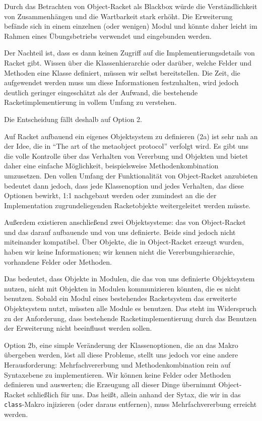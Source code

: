 Durch das Betrachten von Object-Racket als Blackbox würde die Verständlichkeit von Zusammenhängen und die Wartbarkeit stark erhöht. Die Erweiterung befände sich in einem einzelnen (oder wenigen) Modul und könnte daher leicht im Rahmen eines Übungsbetriebs verwendet und eingebunden werden.

Der Nachteil ist, dass es dann keinen Zugriff auf die Implementierungsdetails von Racket gibt. Wissen über die Klassenhierarchie oder darüber, welche Felder und Methoden eine Klasse definiert, müssen wir selbst bereitstellen. Die Zeit, die aufgewendet werden muss um diese Informationen festzuhalten, wird jedoch deutlich geringer eingeschätzt als der Aufwand, die bestehende Racketimplementierung in vollem Umfang zu verstehen. 

Die Entscheidung fällt deshalb auf Option 2.

Auf Racket aufbauend ein eigenes Objektsystem zu definieren (2a) ist sehr nah an der Idee, die in ``The art of the metaobject protocol'' \cite{amop} verfolgt wird. Es gibt uns die volle Kontrolle über das Verhalten von Vererbung und Objekten und bietet daher eine einfache Möglichkeit, beispielsweise Methodenkombination umzusetzen. Den vollen Umfang der Funktionalität von Object-Racket anzubieten bedeutet dann jedoch, dass jede Klassenoption und jedes Verhalten, das diese Optionen bewirkt, 1:1 nachgebaut werden oder zumindest an die der Implementation zugrundeliegenden Racketobjekte weitergeleitet werden müsste.

Außerdem existieren anschließend zwei Objektsysteme: das von Object-Racket und das darauf aufbauende und von uns definierte. Beide sind jedoch nicht miteinander kompatibel. Über Objekte, die in Object-Racket erzeugt wurden, haben wir keine Informationen; wir kennen nicht die Vererbungshierarchie, vorhandene Felder oder Methoden. 

Das bedeutet, dass Objekte in Modulen, die das von uns definierte Objektsystem nutzen, nicht mit Objekten in Modulen kommunizieren könnten, die es nicht benutzen. Sobald ein Modul eines bestehendes Racketsystem das erweiterte Objektsystem nutzt, müssten alle Module es benutzen. Das steht im Widerspruch zu der Anforderung, dass bestehende Racketimplementierung durch das Benutzen der Erweiterung nicht beeinflusst werden sollen.

Option 2b, eine simple Veränderung der Klassenoptionen, die an das Makro übergeben werden, löst all diese Probleme, stellt uns jedoch vor eine andere Herausforderung: Mehrfachvererbung und Methodenkombination rein auf Syntaxebene zu implementieren. Wir können keine Felder oder Methoden definieren und auswerten; die Erzeugung all dieser Dinge übernimmt Object-Racket schließlich für uns. Das heißt, allein anhand der Sytax, die wir in das \texttt{class}-Makro injizieren (oder daraus entfernen), muss Mehrfachvererbung erreicht werden.

